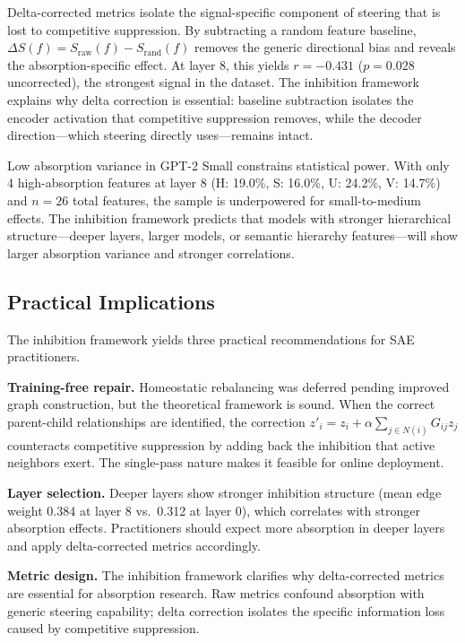 \documentclass{article}
\begin{document}
Delta-corrected metrics isolate the signal-specific component of steering that is lost to competitive suppression. By subtracting a random feature baseline, $\Delta S(f) = S_{\text{raw}}(f) - S_{\text{rand}}(f)$ removes the generic directional bias and reveals the absorption-specific effect. At layer 8, this yields $r = -0.431$ ($p = 0.028$ uncorrected), the strongest signal in the dataset. The inhibition framework explains why delta correction is essential: baseline subtraction isolates the encoder activation that competitive suppression removes, while the decoder direction---which steering directly uses---remains intact.

Low absorption variance in GPT-2 Small constrains statistical power. With only 4 high-absorption features at layer 8 (H: 19.0\%, S: 16.0\%, U: 24.2\%, V: 14.7\%) and $n = 26$ total features, the sample is underpowered for small-to-medium effects. The inhibition framework predicts that models with stronger hierarchical structure---deeper layers, larger models, or semantic hierarchy features---will show larger absorption variance and stronger correlations.

\subsection{Practical Implications}

The inhibition framework yields three practical recommendations for SAE practitioners.

\textbf{Training-free repair.} Homeostatic rebalancing was deferred pending improved graph construction, but the theoretical framework is sound. When the correct parent-child relationships are identified, the correction $z'_i = z_i + \alpha \sum_{j \in N(i)} G_{ij} z_j$ counteracts competitive suppression by adding back the inhibition that active neighbors exert. The single-pass nature makes it feasible for online deployment.

\textbf{Layer selection.} Deeper layers show stronger inhibition structure (mean edge weight 0.384 at layer 8 vs.\ 0.312 at layer 0), which correlates with stronger absorption effects. Practitioners should expect more absorption in deeper layers and apply delta-corrected metrics accordingly.

\textbf{Metric design.} The inhibition framework clarifies why delta-corrected metrics are essential for absorption research. Raw metrics confound absorption with generic steering capability; delta correction isolates the specific information loss caused by competitive suppression.
\end{document}

